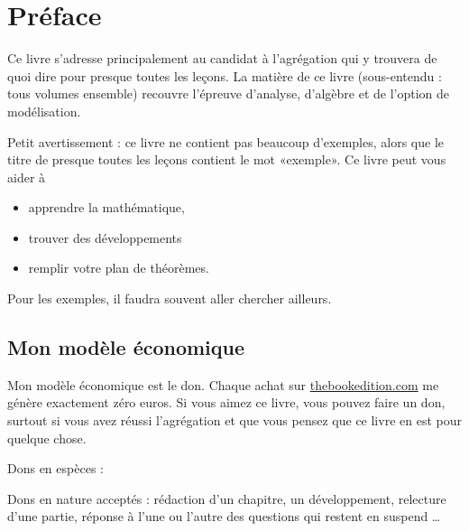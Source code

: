 
\section{Préface}

Ce livre s'adresse principalement au candidat à l'agrégation qui y trouvera de quoi dire pour presque toutes les leçons. La matière de ce livre (sous-entendu : tous volumes ensemble) recouvre l'épreuve d'analyse, d'algèbre et de l'option de modélisation.

Petit avertissement : ce livre ne contient pas beaucoup d'exemples, alors que le titre de presque toutes les leçons contient le mot «exemple». Ce livre peut vous aider à
\begin{itemize}
    \item apprendre la mathématique,
    \item trouver des développements
    \item remplir votre plan de théorèmes.
\end{itemize}
Pour les exemples, il faudra souvent aller chercher ailleurs.

\subsection*{Mon modèle économique}

Mon modèle économique est le don. Chaque achat sur \href{http://www.thebookedition.com/fr/}{thebookedition.com} me génère exactement zéro euros. Si vous aimez ce livre, vous pouvez faire un don, surtout si vous avez réussi l'agrégation et que vous pensez que ce livre en est pour quelque chose.

Dons en espèces :


Dons en nature acceptés : rédaction d'un chapitre, un développement, relecture d'une partie, réponse à l'une ou l'autre des questions qui restent en suspend \ldots
